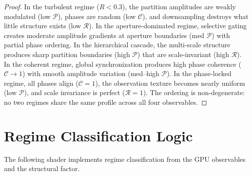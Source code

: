 \documentclass[11pt,twocolumn,a4paper]{article}
\begin{document}
\begin{proof}
In the turbulent regime ($R < 0.3$), the partition amplitudes are weakly modulated (low $\mathcal{P}$), phases are random (low $\mathcal{C}$), and downsampling destroys what little structure exists (low $\mathcal{R}$).
In the aperture-dominated regime, selective gating creates moderate amplitude gradients at aperture boundaries (med $\mathcal{P}$) with partial phase ordering.
In the hierarchical cascade, the multi-scale structure produces sharp partition boundaries (high $\mathcal{P}$) that are scale-invariant (high $\mathcal{R}$).
In the coherent regime, global synchronization produces high phase coherence ($\mathcal{C} \to 1$) with smooth amplitude variation (med--high $\mathcal{P}$).
In the phase-locked regime, all phases align ($\mathcal{C} = 1$), the observation texture becomes nearly uniform (low $\mathcal{P}$), and scale invariance is perfect ($\mathcal{R} = 1$).
The ordering is non-degenerate: no two regimes share the same profile across all four observables.
\end{proof}



\section{Regime Classification Logic}
\label{sec:regime-shader}

The following shader implements regime classification from the GPU observables and the structural factor.
\end{document}
